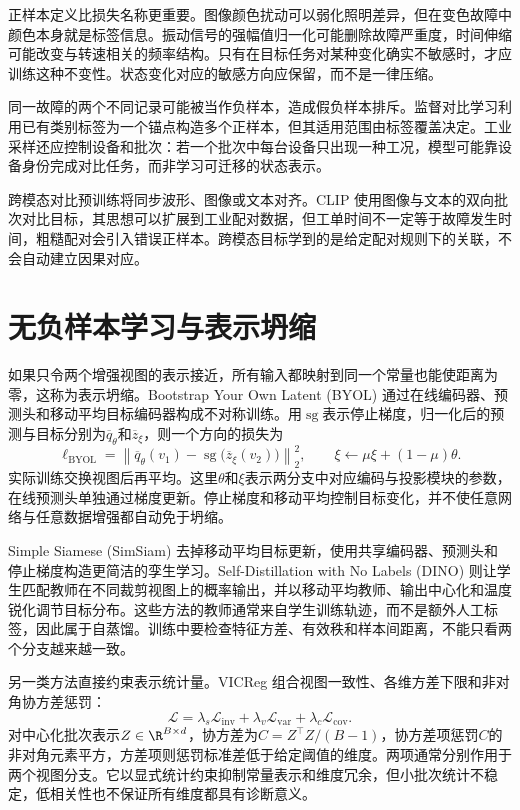 正样本定义比损失名称更重要。图像颜色扰动可以弱化照明差异，但在变色故障中颜色本身就是标签信息。振动信号的强幅值归一化可能删除故障严重度，时间伸缩可能改变与转速相关的频率结构。只有在目标任务对某种变化确实不敏感时，才应训练这种不变性。状态变化对应的敏感方向应保留，而不是一律压缩。

同一故障的两个不同记录可能被当作负样本，造成假负样本排斥。监督对比学习利用已有类别标签为一个锚点构造多个正样本\cite{khosla2020supcon}，但其适用范围由标签覆盖决定。工业采样还应控制设备和批次：若一个批次中每台设备只出现一种工况，模型可能靠设备身份完成对比任务，而非学习可迁移的状态表示。

跨模态对比预训练将同步波形、图像或文本对齐。CLIP 使用图像与文本的双向批次对比目标\cite{radford2021clip}，其思想可以扩展到工业配对数据，但工单时间不一定等于故障发生时间，粗糙配对会引入错误正样本。跨模态目标学到的是给定配对规则下的关联，不会自动建立因果对应。

\section{无负样本学习与表示坍缩}
如果只令两个增强视图的表示接近，所有输入都映射到同一个常量也能使距离为零，这称为表示坍缩。Bootstrap Your Own Latent (BYOL) 通过在线编码器、预测头和移动平均目标编码器构成不对称训练\cite{grill2020byol}。用$\operatorname{sg}$表示停止梯度，归一化后的预测与目标分别为$\overline q_\theta$和$\overline z_\xi$，则一个方向的损失为
\begin{equation}
 \ell_{\mathrm{BYOL}}=
 \left\|\overline q_\theta(v_1)
 -\operatorname{sg}\bigl(\overline z_\xi(v_2)\bigr)\right\|_2^2,
 \qquad \xi\leftarrow\mu\xi+(1-\mu)\theta.
\end{equation}
实际训练交换视图后再平均。这里$\theta$和$\xi$表示两分支中对应编码与投影模块的参数，在线预测头单独通过梯度更新。停止梯度和移动平均控制目标变化，并不使任意网络与任意数据增强都自动免于坍缩。

Simple Siamese (SimSiam) 去掉移动平均目标更新，使用共享编码器、预测头和停止梯度构造更简洁的孪生学习\cite{chen2021simsiam}。Self-Distillation with No Labels (DINO) 则让学生匹配教师在不同裁剪视图上的概率输出，并以移动平均教师、输出中心化和温度锐化调节目标分布\cite{caron2021dino}。这些方法的教师通常来自学生训练轨迹，而不是额外人工标签，因此属于自蒸馏。训练中要检查特征方差、有效秩和样本间距离，不能只看两个分支越来越一致。

另一类方法直接约束表示统计量。VICReg 组合视图一致性、各维方差下限和非对角协方差惩罚\cite{bardes2022vicreg}：
\begin{equation}
 \mathcal L=\lambda_s\mathcal L_{\mathrm{inv}}
 +\lambda_v\mathcal L_{\mathrm{var}}
 +\lambda_c\mathcal L_{\mathrm{cov}}.
\end{equation}
对中心化批次表示$Z\in\R^{B\times d}$，协方差为$C=Z^\top Z/(B-1)$，协方差项惩罚$C$的非对角元素平方，方差项则惩罚标准差低于给定阈值的维度。两项通常分别作用于两个视图分支。它以显式统计约束抑制常量表示和维度冗余，但小批次统计不稳定，低相关性也不保证所有维度都具有诊断意义。

